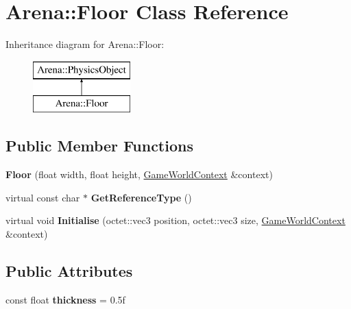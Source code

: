 \hypertarget{class_arena_1_1_floor}{\section{Arena\+:\+:Floor Class Reference}
\label{class_arena_1_1_floor}
}
Inheritance diagram for Arena\+:\+:Floor\+:\begin{figure}[H]
\begin{center}
\leavevmode
\includegraphics[height=2.000000cm]{class_arena_1_1_floor}
\end{center}
\end{figure}
\subsection*{Public Member Functions}
\begin{DoxyCompactItemize}
\item 
\hypertarget{class_arena_1_1_floor_aec378f5495f83305bc8c486c64bdb81b}{{\bfseries Floor} (float width, float height, \hyperlink{struct_arena_1_1_game_world_context}{Game\+World\+Context} \&context)}\label{class_arena_1_1_floor_aec378f5495f83305bc8c486c64bdb81b}

\item 
\hypertarget{class_arena_1_1_floor_a5269562a26498ba8fe4776cdac7244f2}{virtual const char $\ast$ {\bfseries Get\+Reference\+Type} ()}\label{class_arena_1_1_floor_a5269562a26498ba8fe4776cdac7244f2}

\item 
\hypertarget{class_arena_1_1_floor_a76fe3f54c1b59b6af423f0460b4f8d81}{virtual void {\bfseries Initialise} (octet\+::vec3 position, octet\+::vec3 size, \hyperlink{struct_arena_1_1_game_world_context}{Game\+World\+Context} \&context)}\label{class_arena_1_1_floor_a76fe3f54c1b59b6af423f0460b4f8d81}

\end{DoxyCompactItemize}
\subsection*{Public Attributes}
\begin{DoxyCompactItemize}
\item 
\hypertarget{class_arena_1_1_floor_adc0e7b9fc001c5a91f27d132d55977ce}{const float {\bfseries thickness} = 0.\+5f}\label{class_arena_1_1_floor_adc0e7b9fc001c5a91f27d132d55977ce}

\end{DoxyCompactItemize}
